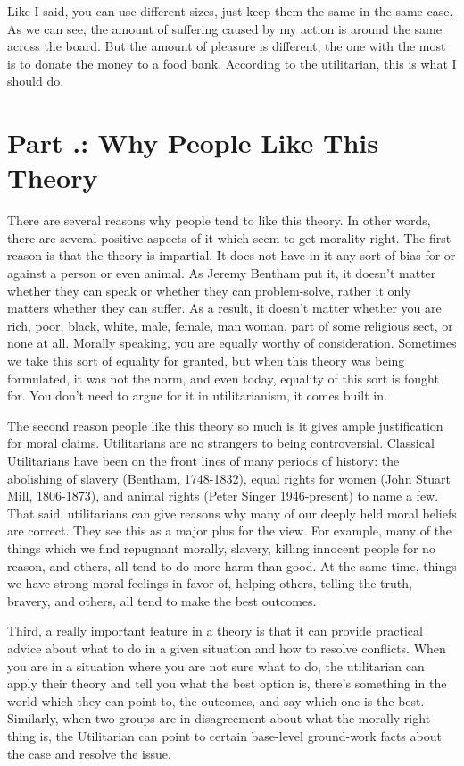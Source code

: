 Like I said, you can use different sizes, just keep them the same in the same case. As we can see, the amount of suffering caused by my action is around the same across the board. But the amount of pleasure is different, the one with the most is to donate the money to a food bank. According to the utilitarian, this is what I should do.

\section{Part \thechapcount.\theseccount: Why People Like This Theory}

There are several reasons why people tend to like this theory. In other words, there are several positive aspects of it which seem to get morality right. The first reason is that the theory is impartial. It does not have in it any sort of bias for or against a person or even animal. As Jeremy Bentham put it, it doesn't matter whether they can speak or whether they can problem-solve, rather it only matters whether they can suffer. As a result, it doesn't matter whether you are rich, poor, black, white, male, female, man woman, part of some religious sect, or none at all. Morally speaking, you are equally worthy of consideration. Sometimes we take this sort of equality for granted, but when this theory was being formulated, it was not the norm, and even today, equality of this sort is fought for. You don’t need to argue for it in utilitarianism, it comes built in.

The second reason people like this theory so much is it gives ample justification for moral claims. Utilitarians are no strangers to being controversial. Classical Utilitarians have been on the front lines of many periods of history: the abolishing of slavery (Bentham, 1748-1832), equal rights for women (John Stuart Mill, 1806-1873), and animal rights (Peter Singer 1946-present) to name a few. That said, utilitarians can give reasons why many of our deeply held moral beliefs are correct. They see this as a major plus for the view. For example, many of the things which we find repugnant morally, slavery, killing innocent people for no reason, and others, all tend to do more harm than good. At the same time, things we have strong moral feelings in favor of, helping others, telling the truth, bravery, and others, all tend to make the best outcomes.

Third, a really important feature in a theory is that it can provide practical advice about what to do in a given situation and how to resolve conflicts. When you are in a situation where you are not sure what to do, the utilitarian can apply their theory and tell you what the best option is, there’s something in the world which they can point to, the outcomes, and say which one is the best. Similarly, when two groups are in disagreement about what the morally right thing is, the Utilitarian can point to certain base-level ground-work facts about the case and resolve the issue.

